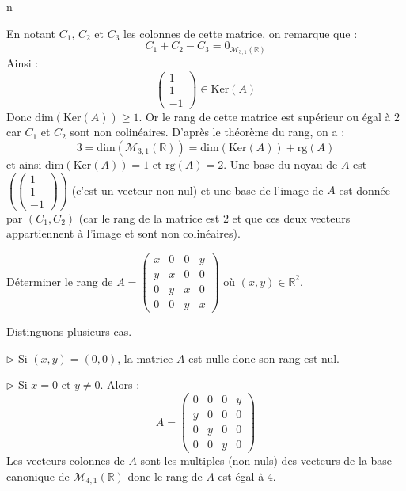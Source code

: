 n\documentclass[a4paper,10pt]{report}
\begin{document}
\corr En notant $C_1$, $C_2$ et $C_3$ les colonnes de cette matrice, on remarque que :
$$C_1+C_2-C_3 = 0_{\mathcal{M}_{3,1}(\mathbb{R})}$$
Ainsi :
$$ \begin{pmatrix}
1 \\
1 \\
-1 
\end{pmatrix} \in \textrm{Ker}(A) $$
Donc $\textrm{dim}(\textrm{Ker}(A)) \geq 1$. Or le rang de cette matrice est supérieur ou égal à $2$ car $C_1$ et $C_2$ sont non colinéaires. D'après le théorème du rang, on a :
$$ 3=\textrm{dim}(\mathcal{M}_{3,1}(\mathbb{R})) = \textrm{dim}(\textrm{Ker}(A)) + \textrm{rg}(A)$$
et ainsi $\textrm{dim}(\textrm{Ker}(A)) = 1$ et $\textrm{rg}(A)=2$. Une base du noyau de $A$ est $\left(  \begin{pmatrix}
1 \\
1 \\
-1 
\end{pmatrix} \right)$ (c'est un vecteur non nul) et une base de l'image de $A$ est donnée par $(C_1,C_2)$ (car le rang de la matrice est $2$ et que ces deux vecteurs appartiennent à l'image et sont non colinéaires).

\begin{Exercice}{} Déterminer le rang de $A = \begin{pmatrix}
x & 0 & 0& y \\
y & x & 0 & 0 \\
0 & y & x & 0 \\
0 & 0 & y & x
\end{pmatrix}$ où $(x,y) \in \mathbb{R}^2$.
\end{Exercice} 

\corr Distinguons plusieurs cas.

\medskip

\noindent $\rhd$ Si $(x,y)=(0,0)$, la matrice $A$ est nulle donc son rang est nul.

\medskip

\noindent $\rhd$ Si $x=0$ et $y \neq 0$. Alors :
$$ A = \begin{pmatrix}
0 & 0 & 0& y \\
y & 0 & 0 & 0 \\
0 & y & 0 & 0 \\
0 & 0 & y & 0
\end{pmatrix}$$
Les vecteurs colonnes de $A$ sont les multiples (non nuls) des vecteurs de la base canonique de $\mathcal{M}_{4,1}(\mathbb{R})$ donc le rang de $A$ est égal à $4$.

\medskip
\end{document}
